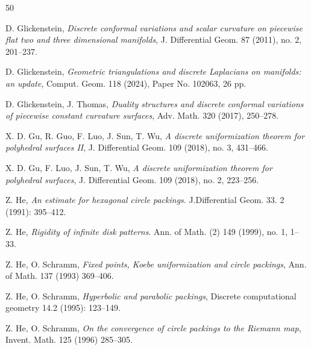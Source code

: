 \documentclass[12pt]{amsart}
\theoremstyle{definition}
\begin{document}
\begin{thebibliography}{50}

 D. Glickenstein, \emph{Discrete conformal variations and scalar curvature on piecewise flat two and three dimensional manifolds}, J. Differential Geom. 87 (2011), no. 2, 201--237.
    
 D. Glickenstein, \emph{Geometric triangulations and discrete Laplacians on manifolds: an update}, Comput. Geom. 118 (2024), Paper No. 102063, 26 pp.

 D. Glickenstein, J. Thomas, \emph{Duality structures and discrete conformal variations of piecewise constant curvature surfaces}, Adv. Math. 320 (2017), 250--278.

 X. D. Gu, R. Guo, F. Luo, J. Sun, T. Wu, \emph{A discrete uniformization theorem for polyhedral surfaces II}, J. Differential Geom. 109 (2018), no. 3, 431--466.

 X. D. Gu, F. Luo, J. Sun, T. Wu, \emph{A discrete uniformization theorem for polyhedral surfaces}, J. Differential Geom. 109 (2018), no. 2, 223--256.



 Z. He, \emph{An estimate for hexagonal circle packings}. J.Differential Geom. 33. 2 (1991): 395--412.

 Z. He, \emph{Rigidity of infinite disk patterns}. Ann. of Math. (2) 149 (1999), no. 1, 1--33.

 Z. He, O. Schramm, \emph{Fixed points, Koebe uniformization and circle packings}, Ann. of Math. 137 (1993) 369--406.

 Z. He, O. Schramm, \emph{Hyperbolic and parabolic packings}, Discrete computational geometry 14.2 (1995): 123--149.

 Z. He, O. Schramm, \emph{On the convergence of circle packings to the Riemann map}, Invent. Math. 125 (1996) 285--305.





\end{thebibliography}
\end{document}
